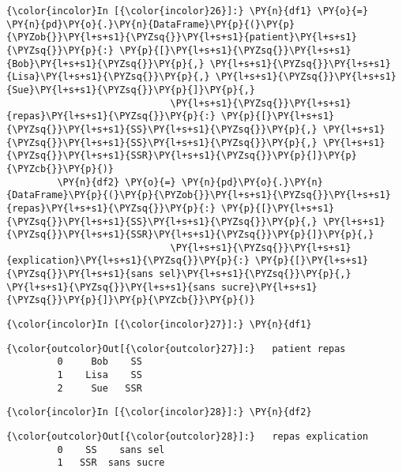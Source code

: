     \begin{Verbatim}[commandchars=\\\{\}]
{\color{incolor}In [{\color{incolor}26}]:} \PY{n}{df1} \PY{o}{=} \PY{n}{pd}\PY{o}{.}\PY{n}{DataFrame}\PY{p}{(}\PY{p}{\PYZob{}}\PY{l+s+s1}{\PYZsq{}}\PY{l+s+s1}{patient}\PY{l+s+s1}{\PYZsq{}}\PY{p}{:} \PY{p}{[}\PY{l+s+s1}{\PYZsq{}}\PY{l+s+s1}{Bob}\PY{l+s+s1}{\PYZsq{}}\PY{p}{,} \PY{l+s+s1}{\PYZsq{}}\PY{l+s+s1}{Lisa}\PY{l+s+s1}{\PYZsq{}}\PY{p}{,} \PY{l+s+s1}{\PYZsq{}}\PY{l+s+s1}{Sue}\PY{l+s+s1}{\PYZsq{}}\PY{p}{]}\PY{p}{,}
                             \PY{l+s+s1}{\PYZsq{}}\PY{l+s+s1}{repas}\PY{l+s+s1}{\PYZsq{}}\PY{p}{:} \PY{p}{[}\PY{l+s+s1}{\PYZsq{}}\PY{l+s+s1}{SS}\PY{l+s+s1}{\PYZsq{}}\PY{p}{,} \PY{l+s+s1}{\PYZsq{}}\PY{l+s+s1}{SS}\PY{l+s+s1}{\PYZsq{}}\PY{p}{,} \PY{l+s+s1}{\PYZsq{}}\PY{l+s+s1}{SSR}\PY{l+s+s1}{\PYZsq{}}\PY{p}{]}\PY{p}{\PYZcb{}}\PY{p}{)}
         \PY{n}{df2} \PY{o}{=} \PY{n}{pd}\PY{o}{.}\PY{n}{DataFrame}\PY{p}{(}\PY{p}{\PYZob{}}\PY{l+s+s1}{\PYZsq{}}\PY{l+s+s1}{repas}\PY{l+s+s1}{\PYZsq{}}\PY{p}{:} \PY{p}{[}\PY{l+s+s1}{\PYZsq{}}\PY{l+s+s1}{SS}\PY{l+s+s1}{\PYZsq{}}\PY{p}{,} \PY{l+s+s1}{\PYZsq{}}\PY{l+s+s1}{SSR}\PY{l+s+s1}{\PYZsq{}}\PY{p}{]}\PY{p}{,}
                             \PY{l+s+s1}{\PYZsq{}}\PY{l+s+s1}{explication}\PY{l+s+s1}{\PYZsq{}}\PY{p}{:} \PY{p}{[}\PY{l+s+s1}{\PYZsq{}}\PY{l+s+s1}{sans sel}\PY{l+s+s1}{\PYZsq{}}\PY{p}{,} \PY{l+s+s1}{\PYZsq{}}\PY{l+s+s1}{sans sucre}\PY{l+s+s1}{\PYZsq{}}\PY{p}{]}\PY{p}{\PYZcb{}}\PY{p}{)}
\end{Verbatim}


    \begin{Verbatim}[commandchars=\\\{\}]
{\color{incolor}In [{\color{incolor}27}]:} \PY{n}{df1}
\end{Verbatim}


\begin{Verbatim}[commandchars=\\\{\}]
{\color{outcolor}Out[{\color{outcolor}27}]:}   patient repas
         0     Bob    SS
         1    Lisa    SS
         2     Sue   SSR
\end{Verbatim}
            
    \begin{Verbatim}[commandchars=\\\{\}]
{\color{incolor}In [{\color{incolor}28}]:} \PY{n}{df2}
\end{Verbatim}


\begin{Verbatim}[commandchars=\\\{\}]
{\color{outcolor}Out[{\color{outcolor}28}]:}   repas explication
         0    SS    sans sel
         1   SSR  sans sucre
\end{Verbatim}
            
